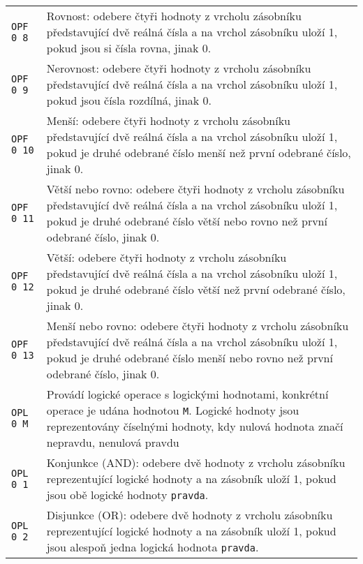 \documentclass{article}
\begin{document}
\begin{longtable}{|l| p{10cm}|}
		\rule{0pt}{4ex} \texttt{OPF 0 8} & Rovnost: odebere čtyři hodnoty z vrcholu zásobníku představující dvě reálná čísla a na vrchol zásobníku uloží 1, pokud jsou si čísla rovna, jinak 0. \\
		
		\rule{0pt}{4ex} \texttt{OPF 0 9} & Nerovnost: odebere čtyři hodnoty z vrcholu zásobníku představující dvě reálná čísla a na vrchol zásobníku uloží 1, pokud jsou čísla rozdílná, jinak 0. \\
		
		\rule{0pt}{4ex} \texttt{OPF 0 10} & Menší: odebere čtyři hodnoty z vrcholu zásobníku představující dvě reálná čísla a na vrchol zásobníku uloží 1, pokud je druhé odebrané číslo menší než první odebrané číslo, jinak 0. \\
		
		\rule{0pt}{4ex} \texttt{OPF 0 11} & Větší nebo rovno: odebere čtyři hodnoty z vrcholu zásobníku představující dvě reálná čísla a na vrchol zásobníku uloží 1, pokud je druhé odebrané číslo větší nebo rovno než první odebrané číslo, jinak 0. \\
		
		\rule{0pt}{4ex} \texttt{OPF 0 12} & Větší: odebere čtyři hodnoty z vrcholu zásobníku představující dvě reálná čísla a na vrchol zásobníku uloží 1, pokud je druhé odebrané číslo větší než první odebrané číslo, jinak 0. \\
		
		\rule{0pt}{4ex} \texttt{OPF 0 13} & Menší nebo rovno: odebere čtyři hodnoty z vrcholu zásobníku představující dvě reálná čísla a na vrchol zásobníku uloží 1, pokud je druhé odebrané číslo menší nebo rovno než první odebrané číslo, jinak 0. \\ \hline
		
		\rule{0pt}{3ex} \texttt{OPL 0 M} & Provádí logické operace s logickými hodnotami, konkrétní operace je udána hodnotou \texttt{M}. Logické hodnoty jsou reprezentovány číselnými hodnoty, kdy nulová hodnota značí nepravdu, nenulová pravdu \\
		
		\rule{0pt}{4ex} \texttt{OPL 0 1} & Konjunkce (AND): odebere dvě hodnoty z vrcholu zásobníku reprezentující logické hodnoty a na zásobník uloží 1, pokud jsou obě logické hodnoty \texttt{pravda}. \\
		
		\rule{0pt}{4ex} \texttt{OPL 0 2} & Disjunkce (OR): odebere dvě hodnoty z vrcholu zásobníku reprezentující logické hodnoty a na zásobník uloží 1, pokud jsou alespoň jedna logická hodnota \texttt{pravda}. \\
		

\end{longtable}
\end{document}
